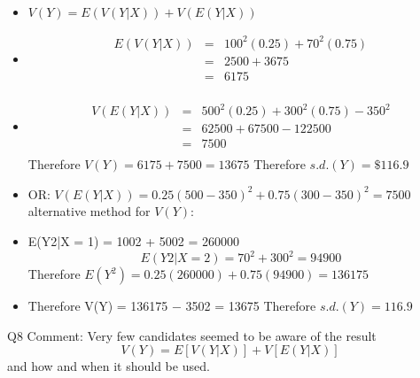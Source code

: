 \documentclass[a4paper,12pt]{article}
\begin{document}
\begin{itemize}
    \item $V(Y) = E(V(Y|X)) + V(E(Y|X))$
\item \begin{eqnarray*}
E(V(Y|X)) &=& 100^2(0.25) + 70^2(0.75)\\
&=& 2500 + 3675\\ &=& 6175\\
\end{eqnarray*}
\item \begin{eqnarray*}V(E(Y|X)) &=& 500^2(0.25) + 300^2(0.75) − 350^2\\
&=& 62500 + 67500 − 122500 \\ &=& 7500\\
\end{eqnarray*}
Therefore $V(Y) = 6175 + 7500 = 13675$
Therefore $s.d.(Y) = \$116.9$
\item OR: $V(E(Y|X)) = 0.25(500 − 350)^2 + 0.75(300 − 350)^2 = 7500$
alternative method for $V(Y)$:
\item E(Y2|X = 1) = 1002 + 5002 = 260000
\[E(Y2|X=2) = 70^2 + 300^2 = 94900\]
Therefore $E(Y^2) = 0.25(260000) + 0.75(94900)
= 136175$
\item Therefore V(Y) = 136175 − 3502 = 13675
Therefore $s.d.(Y) = 116.9$
\end{itemize}

Q8 Comment: Very few candidates seemed to be aware of the result \[V(Y) = E[V(Y|X)]
+ V[E(Y|X)] \]and how and when it should be used.
\end{document}

